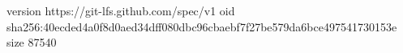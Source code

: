 version https://git-lfs.github.com/spec/v1
oid sha256:40ecded4a0f8d0aed34dff080dbc96cbaebf7f27be579da6bce497541730153e
size 87540
